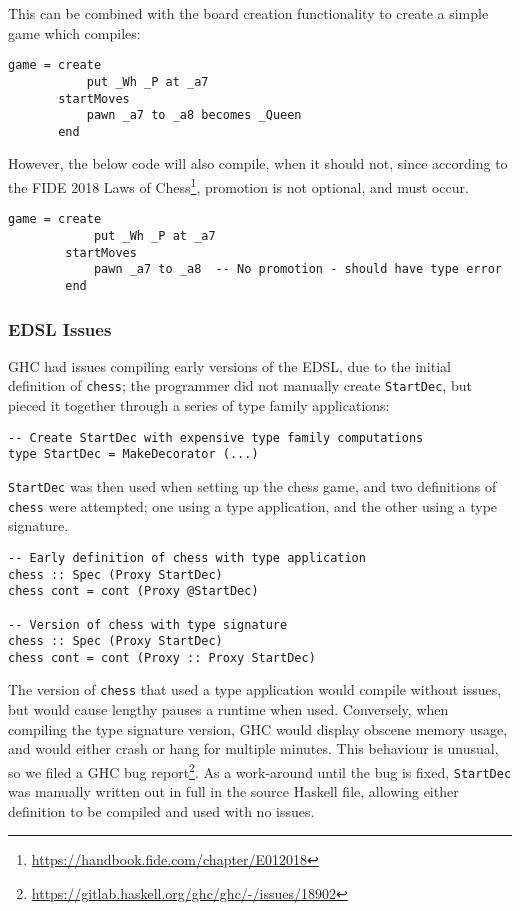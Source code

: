 \documentclass[12pt, a4paper]{scrartcl}
\begin{document}
This can be combined with the board creation functionality to create a simple game which compiles:

\begin{lstlisting}
game = create
           put _Wh _P at _a7
       startMoves
           pawn _a7 to _a8 becomes _Queen
       end
\end{lstlisting}

However, the below code will also compile, when it should not, since according to the FIDE 2018 Laws of Chess\footnote{\url{https://handbook.fide.com/chapter/E012018}}, promotion is not optional, and must occur.

\begin{lstlisting}
game = create
            put _Wh _P at _a7
        startMoves
            pawn _a7 to _a8  -- No promotion - should have type error
        end
\end{lstlisting}

\subsubsection{EDSL Issues}

GHC had issues compiling early versions of the EDSL, due to the initial definition of \lstinline{chess}; the programmer did not manually create \lstinline{StartDec}, but pieced it together through a series of type family applications:

\begin{lstlisting}
-- Create StartDec with expensive type family computations
type StartDec = MakeDecorator (...)
\end{lstlisting}

\lstinline{StartDec} was then used when setting up the chess game, and two definitions of \lstinline{chess} were attempted; one using a type application, and the other using a type signature.

\begin{lstlisting}
-- Early definition of chess with type application
chess :: Spec (Proxy StartDec)
chess cont = cont (Proxy @StartDec)

-- Version of chess with type signature
chess :: Spec (Proxy StartDec)
chess cont = cont (Proxy :: Proxy StartDec)
\end{lstlisting}

The version of \lstinline{chess} that used a type application would compile without issues, but would cause lengthy pauses a runtime when used. Conversely, when compiling the type signature version, GHC would display obscene memory usage, and would either crash or hang for multiple minutes. This behaviour is unusual, so we filed a GHC bug report\footnote{\url{https://gitlab.haskell.org/ghc/ghc/-/issues/18902}}. As a work-around until the bug is fixed, \lstinline{StartDec} was manually written out in full in the source Haskell file, allowing either definition to be compiled and used with no issues.
\end{document}
